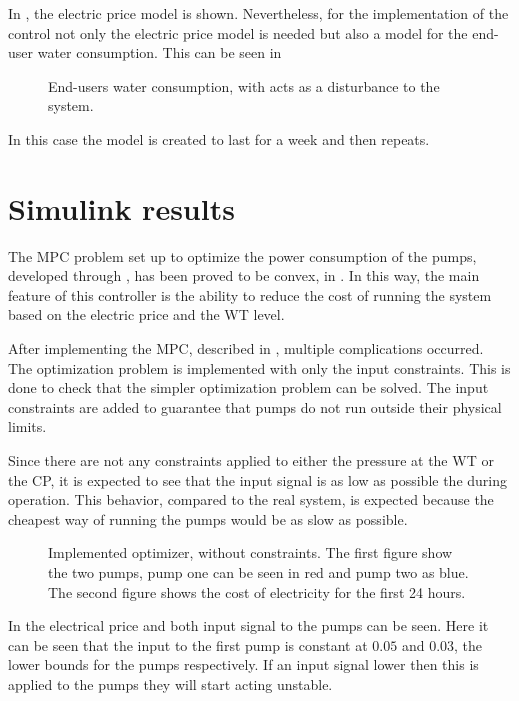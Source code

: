 In , the electric price model is shown. Nevertheless, for the implementation of the control not only the electric price model is needed but also a model for the end-user water consumption. This can be seen in 

\begin{figure}[H]
\centering
 
\caption{End-users water consumption, with acts as a disturbance to the system.}
\label{fig:water_consumption}
\end{figure}

In this case the model is created to last for a week and then repeats. 


\section{Simulink results}
The MPC problem set up to optimize the power consumption of the pumps, developed through , has been proved to be convex, in . In this way, the main feature of this controller is the ability to reduce the cost of running the system based on the electric price and the WT level. 

After implementing the MPC, described in , multiple complications occurred. The optimization problem is implemented with only the input constraints. This is done to check that the simpler optimization problem can be solved. The input constraints are added to guarantee that pumps do not run outside their physical limits. 

Since there are not any constraints applied to either the pressure at the WT or the CP, it is expected to see that the input signal is as low as possible the during operation. This behavior, compared to the real system, is expected because the cheapest way of running the pumps would be as slow as possible. 

\begin{figure}[H]
\centering
 
\caption{Implemented optimizer, without constraints. The first figure show the two pumps, pump one can be seen in red and pump two as blue. The second figure shows the cost of electricity for the first 24 hours.}
\label{fig:Implementation_shit}
\end{figure}

In  the electrical price and both input signal to the pumps can be seen. Here it can be seen that the input to the first pump is constant at $0.05$ and $0.03$, the lower bounds for the pumps respectively. If an input signal lower then this is applied to the pumps they will start acting unstable. 

